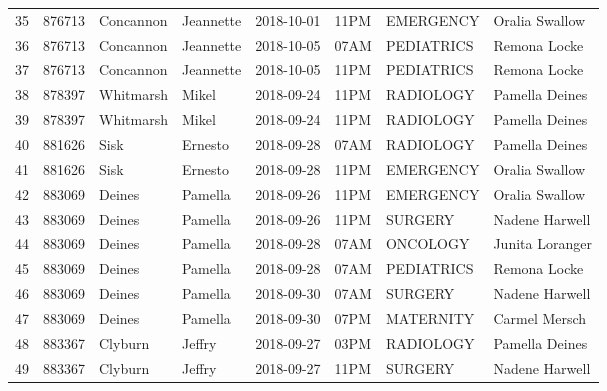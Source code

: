 \documentclass[11pt]{article}
\begin{document}
\begin{tabular}{|l|l|l|l|l|l|l|l|}
	35 &  876713 &   Concannon &  Jeannette &      2018-10-01 &  11PM &       EMERGENCY &   Oralia Swallow \\
	36 &  876713 &   Concannon &  Jeannette &      2018-10-05 &  07AM &      PEDIATRICS &     Remona Locke \\
	37 &  876713 &   Concannon &  Jeannette &      2018-10-05 &  11PM &      PEDIATRICS &     Remona Locke \\
	38 &  878397 &   Whitmarsh &      Mikel &      2018-09-24 &  11PM &       RADIOLOGY &   Pamella Deines \\
	39 &  878397 &   Whitmarsh &      Mikel &      2018-09-24 &  11PM &       RADIOLOGY &   Pamella Deines \\
	40 &  881626 &        Sisk &    Ernesto &      2018-09-28 &  07AM &       RADIOLOGY &   Pamella Deines \\
	41 &  881626 &        Sisk &    Ernesto &      2018-09-28 &  11PM &       EMERGENCY &   Oralia Swallow \\
	42 &  883069 &      Deines &    Pamella &      2018-09-26 &  11PM &       EMERGENCY &   Oralia Swallow \\
	43 &  883069 &      Deines &    Pamella &      2018-09-26 &  11PM &         SURGERY &   Nadene Harwell \\
	44 &  883069 &      Deines &    Pamella &      2018-09-28 &  07AM &        ONCOLOGY &  Junita Loranger \\
	45 &  883069 &      Deines &    Pamella &      2018-09-28 &  07AM &      PEDIATRICS &     Remona Locke \\
	46 &  883069 &      Deines &    Pamella &      2018-09-30 &  07AM &         SURGERY &   Nadene Harwell \\
	47 &  883069 &      Deines &    Pamella &      2018-09-30 &  07PM &       MATERNITY &    Carmel Mersch \\
	48 &  883367 &     Clyburn &     Jeffry &      2018-09-27 &  03PM &       RADIOLOGY &   Pamella Deines \\
	49 &  883367 &     Clyburn &     Jeffry &      2018-09-27 &  11PM &         SURGERY &   Nadene Harwell \\
	\bottomrule
\end{tabular}

\newpage
\end{document}
